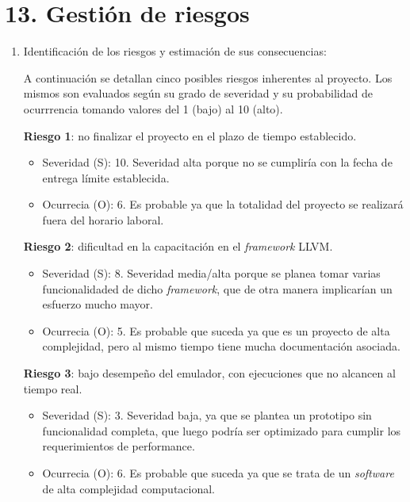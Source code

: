 
\section{13. Gestión de riesgos}
\label{sec:riesgos}

\begin{enumerate}[label=\alph*)] %
\item Identificación de los riesgos y estimación de sus consecuencias:

  A continuación se detallan cinco posibles riesgos inherentes al proyecto. Los mismos son evaluados según su grado de severidad y su probabilidad de ocurrrencia tomando valores del 1 (bajo) al 10 (alto).

  \textbf{Riesgo 1}: no finalizar el proyecto en el plazo de tiempo establecido.

  \begin{itemize}
  \item Severidad (S): 10. Severidad alta porque no se cumpliría con la fecha de entrega límite establecida.
  \item Ocurrecia (O): 6. Es probable ya que la totalidad del proyecto se realizará fuera del horario laboral.
  \end{itemize}

  \textbf{Riesgo 2}: dificultad en la capacitación en el \textit{framework} LLVM.


  \begin{itemize}
  \item Severidad (S): 8. Severidad media/alta porque se planea tomar varias funcionalidaded de dicho \textit{framework}, que de otra manera implicarían un esfuerzo mucho mayor.
  \item Ocurrecia (O): 5. Es probable que suceda ya que es un proyecto de alta complejidad, pero al mismo tiempo tiene mucha documentación asociada.
  \end{itemize}

  \textbf{Riesgo 3}: bajo desempeño del emulador, con ejecuciones que no alcancen al tiempo real.

  \begin{itemize}
  \item Severidad (S): 3. Severidad baja, ya que se plantea un prototipo sin funcionalidad completa, que luego podría ser optimizado para cumplir los requerimientos de performance.
  \item Ocurrecia (O): 6. Es probable que suceda ya que se trata de un \textit{software} de alta complejidad computacional.
  \end{itemize}


\end{enumerate}
